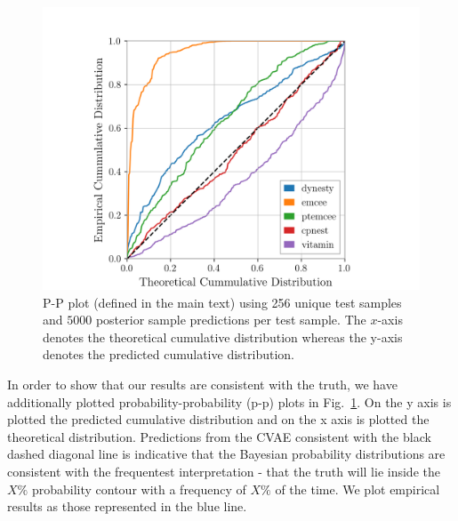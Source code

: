 \documentclass[%
showpacs,
 amsmath,amssymb,
 aps,
 twocolumn,
 prl,
 reprint,
floatfix,
]{revtex4-1}
\newcommand{\chris}[1]{\textbf{\textcolor{red}{CHRIS: #1}}}
\begin{document}
%
%
\begin{figure}
    \includegraphics[width=\columnwidth]{images/latest_pp_plot.png}
    \caption{\label{fig:pp_plot} P-P plot (defined in the main text) using 256
unique test samples and $5000$ posterior sample predictions per test sample.
The $x$-axis denotes the theoretical cumulative distribution whereas the y-axis
denotes the predicted cumulative distribution.
}
\end{figure}
%

%
%
In
order to show that our results are consistent with the truth, we have
additionally plotted probability-probability (p-p) plots in
Fig.~\ref{fig:pp_plot}. On the y axis is plotted the predicted cumulative
distribution and on the x axis is plotted the theoretical distribution.
Predictions from the \ac{CVAE} consistent with the black dashed diagonal line
is indicative that the Bayesian probability distributions are consistent with
the frequentest interpretation - that the truth will lie inside the $X\%$
probability contour with a frequency of $X\%$ of the time.  We plot empirical
results as those represented in the blue line. 
\end{document}

